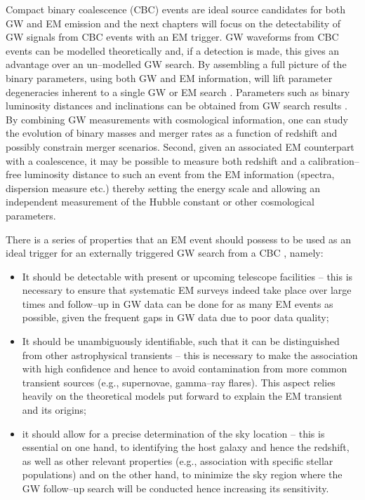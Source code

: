 Compact binary coalescence (\ac{CBC}) events are ideal source candidates for both \ac{GW} and \ac{EM} emission and the next chapters will focus on the detectability of \ac{GW} signals from \ac{CBC} events with an \ac{EM} trigger. \ac{GW} waveforms from \ac{CBC} events can be modelled theoretically and, if a detection is made, this gives an advantage over an un--modelled \ac{GW} search. By assembling a full picture of the binary parameters, using both \ac{GW} and \ac{EM} information, will lift parameter degeneracies inherent to a single \ac{GW} or \ac{EM} search \cite{Holz:2002cn, Chernoff:1993th}. Parameters such as binary luminosity distances and inclinations can be obtained from \ac{GW} search results \cite{Veitch:2009hd}. By combining \ac{GW} measurements with cosmological information, one can study the evolution of binary masses and merger rates as a function of redshift and possibly constrain merger scenarios. Second, given an associated \ac{EM} counterpart with a coalescence, it may be possible to measure both redshift and a calibration--free luminosity distance to such an event from the \ac{EM} information (spectra, dispersion measure etc.) thereby setting the energy scale and allowing an independent measurement of the Hubble constant or other cosmological parameters.

There is a series of properties that an \ac{EM} event should possess to be used as an ideal trigger for an externally triggered \ac{GW} search from a \ac{CBC} \cite{Metzger:2011bv}, namely: 
\begin{itemize}
\item
It should be detectable with present or upcoming telescope facilities -- this is necessary to ensure that systematic \ac{EM} surveys indeed take place over large times and follow--up in \ac{GW} data can be done for as many \ac{EM} events as possible, given the frequent gaps in \ac{GW} data due to poor data quality; 
\item
It should be unambiguously identifiable, such that it can be distinguished from other astrophysical transients -- this is necessary to make the association with high confidence and hence to avoid contamination from more common transient sources (e.g., supernovae, gamma--ray flares). This aspect relies heavily on the theoretical models put forward to explain the \ac{EM} transient and its origins; 
\item
it should allow for a precise determination of the sky location -- this is essential on one hand, to identifying the host galaxy and hence the redshift, as well as other relevant properties (e.g., association with specific stellar populations) and on the other hand, to minimize the sky region where the GW follow--up search will be conducted hence increasing its sensitivity. 
\end{itemize}

